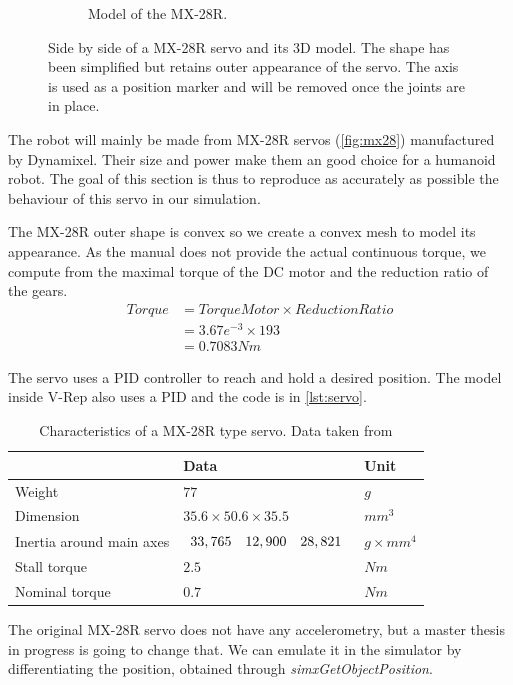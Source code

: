 \begin{figure}[htp]
\begin{subfigure}[b]{0.3\textwidth}
    \caption{Model of the MX-28R.}
    \label{fig:mx28_model}
\end{subfigure}
\caption[Side by side of a MX-28R servo and its 3D model]{Side by side of a MX-28R servo and its 3D model. The shape has been simplified but retains outer appearance of the servo. The axis is used as a position marker and will be removed once the joints are in place.}
\label{fig:servo}
\end{figure}

The robot will mainly be made from MX-28R servos (\cref{fig:mx28}) manufactured by Dynamixel. Their size and power make them an good choice for a humanoid robot. The goal of this section is thus to reproduce as accurately as possible the behaviour of this servo in our simulation. 

The MX-28R outer shape is convex so we create a convex mesh to model its appearance. As the manual \cite{mx_28_manual} does not provide the actual continuous torque, we compute from the maximal torque of the DC motor and the reduction ratio of the gears. 
\begin{align*}
Torque &= TorqueMotor \times ReductionRatio\\
&= 3.67e^{-3} \times 193\\
&= 0.7083Nm
\end{align*}

\begin{table}[htp]

The servo uses a PID controller to reach and hold a desired position. The model inside V-Rep also uses a PID and the code is in \cref{lst:servo}.

\begin{tabularx}{\textwidth}{@{} l l X @{}}
\toprule
& \textbf{Data} & \textbf{Unit}\\ 
\midrule
Weight & $77$ & $g$\\
Dimension & $35.6 \times 50.6 \times 35.5$ & $mm^3$\\
Inertia around main axes & $\begin{array}{c c c}
33,765 & 12,900 & 28,821
\end{array}$ & $g \times mm^4$ \\
Stall torque & $2.5$ & $Nm$\\
Nominal torque & $0.7$ & $Nm$\\
\bottomrule
\end{tabularx}
\caption{Characteristics of a MX-28R type servo. Data taken from \cite{mx_28_manual}}
\label{table:specs}
\end{table} 

The original MX-28R servo does not have any accelerometry, but a master thesis in progress is going to change that. We can emulate it in the simulator by differentiating the position, obtained through \emph{simxGetObjectPosition}. 